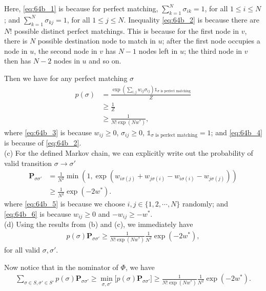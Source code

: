 \documentclass{article}
\newcommand{\qeds}{\hfill\qedsymbol}
\newcommand{\bm}{\mathbf}
\begin{document}
Here, \eqref{eq:64b_1} is because for perfect matching,
$\sum_{k=1}^N \sigma_{ik} = 1$, for all $1\leq i \leq N$; and
$\sum_{k=1}^N \sigma_{kj} = 1$, for all $1\leq j \leq N$.
Inequality \eqref{eq:64b_2} is because there are $N!$ possible
distinct perfect matchings. This is because for the first node in $v$,
there is $N$ possible destination node to match in $u$;
after the first node occupies a node in $u$, the second node in $v$ has $N-1$ nodes
left in $u$;
the third node in $v$ then has $N-2$ nodes in $u$ and so on.

Then we have for any perfect matching $\sigma$
\begin{align}
	p(\sigma) &= \frac{\exp\left(\sum_{i,j}w_{ij}\sigma_{ij}\right)\mathds{1}_{\sigma \text{ is perfect matching}}}{Z}\\
	& \geq \frac{1}{Z} \label{eq:64b_3}\\
	& \geq \frac{1}{N!\exp\left(Nw^*\right)}, \label{eq:64b_4}
\end{align}
where \eqref{eq:64b_3} is because $w_{ij} \geq 0$, $\sigma_{ij} \geq 0$, $\mathds{1}_{\sigma \text{ is perfect matching}} = 1$; and \eqref{eq:64b_4} is because of \eqref{eq:64b_2}. \qeds
\\

\noindent
(c) For the defined Markov chain, we can explicitly write out the probability of valid
transition $\sigma \to \sigma'$
\begin{align}
	\bm{P}_{\sigma \sigma'} &= \frac{1}{N^2}\min(1, \exp(w_{i\sigma(j)} + w_{j\sigma(i)} - w_{i\sigma(i)} - w_{j\sigma(j)}))\label{eq:64b_5}\\
	&\geq \frac{1}{N^2}\exp(-2w^*). \label{eq:64b_6}
\end{align}
where \eqref{eq:64b_5} is because we choose $i, j \in \{1, 2, \cdots, N\}$ randomly; and 
\eqref{eq:64b_6} is because $w_{ij} \geq 0$ and $-w_{ij} \geq -w^*$. \qeds
\\

\noindent
(d) Using the results from (b) and (c), we immediately have
\begin{align*}
	p(\sigma)\bm{P}_{\sigma\sigma'} \geq \frac{1}{N!\exp\left(Nw^*\right)}\frac{1}{N^2}\exp(-2w^*),
\end{align*}
for all valid $\sigma, \sigma'$.

Now notice that in the nominator of $\Phi$, we have
\begin{align*}
	\sum_{\sigma\in S, \sigma'\in S'} p(\sigma)\bm{P}_{\sigma\sigma'} \geq \min_{\sigma, \sigma'}\bigg[ p(\sigma)\bm{P}_{\sigma\sigma'}\bigg] \geq \frac{1}{N!\exp\left(Nw^*\right)}\frac{1}{N^2}\exp(-2w^*).
\end{align*}
\end{document}
